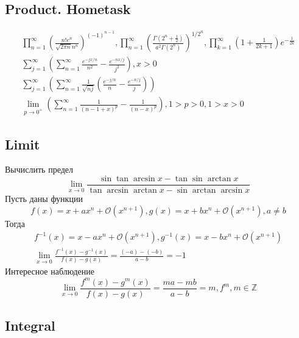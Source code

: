 	\subsection{Product. Hometask}
	
	$$
	\begin{gathered}
		\prod_{n=1}^{\infty}\left(\frac{n ! e^n}{\sqrt{2 \pi n} n^n}\right)^{(-1)^{n-1}}, \prod_{n=1}^{\infty}\left(\frac{\Gamma\left(2^n+\frac{1}{2}\right)}{a^2 \Gamma\left(2^n\right)}\right)^{1 / 2^n}, \prod_{k=1}^{\infty}\left(1+\frac{1}{2 k+1}\right) e^{-\frac{1}{2 k}} \\
		\sum_{j=1}^{\infty}\left(\sum_{n=1}^{\infty} \frac{e^{-j x / n}}{n^2}-\frac{e^{-n x / j}}{j^2}\right), x>0 \\
		\sum_{j=1}^{\infty}\left(\sum_{n=1}^{\infty} \frac{1}{\sqrt{n j}}\left(\frac{e^{-j / n}}{n}-\frac{e^{-n / j}}{j}\right)\right) \\
		\lim _{p \rightarrow 0^{+}}\left(\sum_{n=1}^{\infty} \frac{1}{(n-1+x)^p}-\frac{1}{(n-x)^p}\right), 1>p>0,1>x>0
	\end{gathered}
	$$
	
	\subsection{Limit}
	
	Вычислить предел
	$$
	\lim _{x \rightarrow 0} \frac{\sin \tan \arcsin x-\tan \sin \arctan x}{\tan \arcsin \arctan x-\sin \arctan \arcsin x}
	$$
	Пусть даны функции
	$$
	f(x)=x+a x^n+\mathcal{O}\left(x^{n+1}\right), g(x)=x+b x^n+\mathcal{O}\left(x^{n+1}\right), a \neq b
	$$
	Тогда
	$$
	\begin{gathered}
		f^{-1}(x)=x-a x^n+\mathcal{O}\left(x^{n+1}\right), g^{-1}(x)=x-b x^n+\mathcal{O}\left(x^{n+1}\right) \\
		\lim _{x \rightarrow 0} \frac{f^{-1}(x)-g^{-1}(x)}{f(x)-g(x)}=\frac{(-a)-(-b)}{a-b}=-1
	\end{gathered}
	$$
	Интересное наблюдение
	$$
	\lim _{x \rightarrow 0} \frac{f^m(x)-g^m(x)}{f(x)-g(x)}=\frac{m a-m b}{a-b}=m, f^m, m \in \mathbb{Z}
	$$
	
	\subsection{Integral}
	

